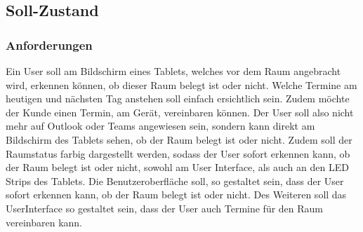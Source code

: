 \pagebreak
\subsection{Soll-Zustand}\label{subsec:soll-zustand}
\subsubsection{Anforderungen}\label{subsubsec:anforderungen}
Ein User soll am Bildschirm eines Tablets, welches vor dem Raum angebracht wird, erkennen können, ob dieser Raum belegt ist oder nicht.
Welche Termine am heutigen und nächsten Tag anstehen soll einfach ersichtlich sein.
Zudem möchte der Kunde einen Termin, am Gerät, vereinbaren können.
Der User soll also nicht mehr auf Outlook oder Teams angewiesen sein, sondern kann direkt am Bildschirm des Tablets sehen, ob der Raum belegt ist oder nicht.
Zudem soll der Raumstatus farbig dargestellt werden, sodass der User sofort erkennen kann, ob der Raum belegt ist oder nicht, sowohl am User Interface, als auch an den LED Strips des Tablets.
Die Benutzeroberfläche soll, so gestaltet sein, dass der User sofort erkennen kann, ob der Raum belegt ist oder nicht.
Des Weiteren soll das \gls{UserInterface} so gestaltet sein, dass der User auch Termine für den Raum vereinbaren kann.

